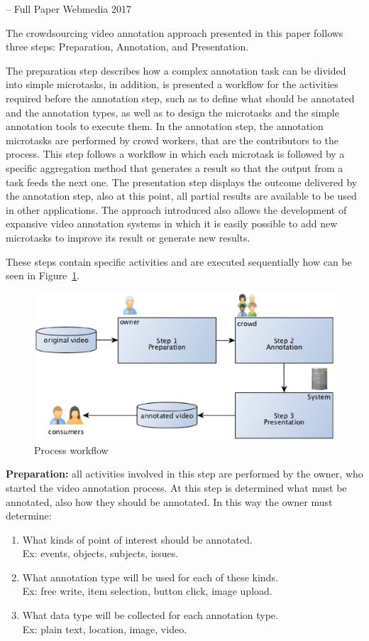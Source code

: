 --	Full Paper Webmedia 2017 \cite{172450}

The crowdsourcing video annotation approach presented in this paper follows three steps: Preparation, Annotation, and Presentation. 

The preparation step describes how a complex annotation task can be divided into simple microtasks, in addition, is presented a workflow for the activities required before the annotation step, such as to define what should be annotated and the annotation types, as well as to design the microtasks and the simple annotation tools to execute them. In the annotation step, the annotation microtasks are performed by crowd workers, that are the contributors to the process. This step follows a workflow in which each microtask is followed by a specific aggregation method that generates a result so that the output from a task feeds the next one. The presentation step displays the outcome delivered by the annotation step, also at this point, all partial results are available to be used in other applications. The approach introduced also allows the development of expansive video annotation systems in which it is easily possible to add new microtasks to improve its result or generate new results. 

These steps contain specific activities and are executed sequentially how can be seen in Figure~\ref{process}.

\begin{figure}[h]
	\centerline{\includegraphics[scale=0.4] {figure/process}}
	\caption{Process workflow}
	\label{process}
\end{figure}

\textbf{Preparation:} all activities involved in this step are performed by the owner, who started the video annotation process. At this step is determined what must be annotated, also how they should be annotated. In this way the owner must determine:
\begin{enumerate}
\item What kinds of point of interest should be annotated.\\Ex: events, objects, subjects, issues.
\item What annotation type will be used for each of these kinds.\\Ex: free write, item selection, button click, image upload.
\item What data type will be collected for each annotation type.\\Ex: plain text, location, image, video.
\end{enumerate}

